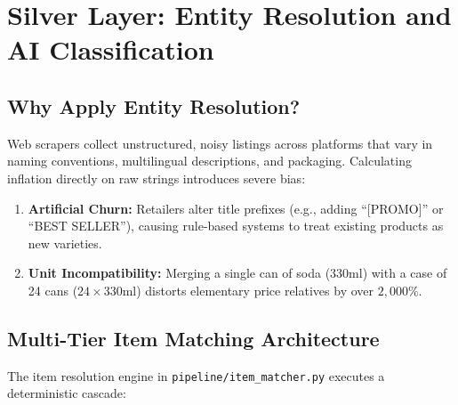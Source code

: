 \documentclass[11pt,a4paper]{article}
\begin{document}
\newpage

\section{Silver Layer: Entity Resolution and AI Classification}

\subsection{Why Apply Entity Resolution?}
Web scrapers collect unstructured, noisy listings across platforms that vary in naming conventions, multilingual descriptions, and packaging. Calculating inflation directly on raw strings introduces severe bias:
\begin{enumerate}
    \item \textbf{Artificial Churn:} Retailers alter title prefixes (e.g., adding ``[PROMO]'' or ``BEST SELLER''), causing rule-based systems to treat existing products as new varieties.
    \item \textbf{Unit Incompatibility:} Merging a single can of soda ($330\text{ml}$) with a case of 24 cans ($24 \times 330\text{ml}$) distorts elementary price relatives by over $2,000\%$.
\end{enumerate}

\subsection{Multi-Tier Item Matching Architecture}
The item resolution engine in \texttt{pipeline/item\_matcher.py} executes a deterministic cascade:
\end{document}
